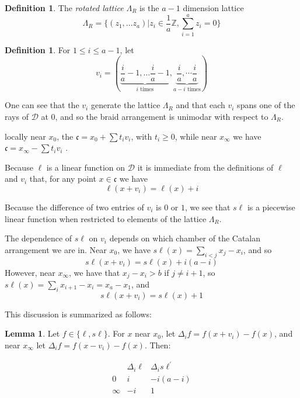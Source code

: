 \documentclass{amsart}[12pt]
\theoremstyle{definition}
\newtheorem{lemma}[dummy]{Lemma}
\newtheorem{definition}[dummy]{Definition}
\newcommand{\Z}{\mathbb{Z}}
\newcommand{\sk}{s\ell}
\newcommand{\cone}{\mathfrak{c}}
\newcommand{\dominant}{\mathcal{D}}
\begin{document}
\begin{definition} The \emph{rotated lattice} $\Lambda_R$ is the $a-1$ dimension lattice
$$\Lambda_R=\{(z_1,\dots z_a)|z_i\in \frac{1}{a}\Z, \sum_{i=1}^a z_i=0\}$$
\end{definition}

\begin{definition}
For $1\leq i\leq a-1$, let $$v_i=\left(\underbrace{\frac{i}{a}-1,\dots \frac{i}{a}-1}_{i \text{ times}},\underbrace{ \frac{i}{a},\dotsm\frac{i}{a}}_{a-i \text{ times}}\right)$$
\end{definition}

One can see that the $v_i$ generate the lattice $\Lambda_R$ and that each $v_i$ spans one of the rays of $\dominant$ at $0$, and so the braid arrangement is unimodar with respect to $\Lambda_R$.


locally near $x_0$, the $\cone=x_0+\sum t_i v_i$, with $t_i\geq 0$, while near $x_\infty$ we have $\cone=x_\infty-\sum t_iv_i$ .

Because $\ell$ is a linear function on $\dominant$ it is immediate from the definitions of $\ell$ and $v_i$ that, for any point $x\in\cone$ we have  
$$\ell(x+v_i)=\ell(x)+i$$

Because the difference of two entries of $v_i$ is $0$ or $1$, we see that $\sk$ is a piecewise linear function when restricted to elements of the lattice $\Lambda_R$.

The dependence of $\sk$ on $v_i$ depends on which chamber of the Catalan arrangement we are in.  Near $x_0$, we have $\sk(x)=\sum_{i<j} x_j-x_i$, and so
$$\sk(x+v_i) = \sk(x)+i(a-i)$$
However, near $x_\infty$, we have that $x_j-x_i>b$ if $j\neq i+1$, so $\sk(x)=\sum_i x_{i+1}-x_i=x_a-x_1$, and
$$\sk(x+v_i)=\sk(x)+1$$

This discussion is summarized as follows:

\begin{lemma} \label{lem:table}
Let $f\in\{\ell,\sk\}$.  For $x$ near $x_0$, let $\Delta_if=f(x+v_i)-f(x)$, and near $x_\infty$ let $\Delta_if=f(x-v_i)-f(x)$.  Then:

$$\begin{array}{r|cc}
 & \Delta_i\ell & \Delta_i\sk^\prime \\
\hline
0 & i & -i(a-i) \\
\infty & -i & 1
\end{array}
$$
\end{lemma}
\end{document}
